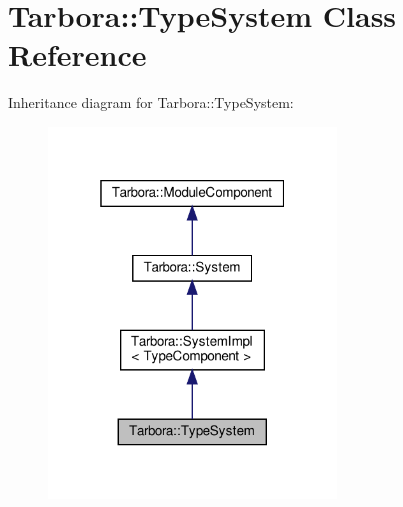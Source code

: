 \hypertarget{classTarbora_1_1TypeSystem}{}\section{Tarbora\+:\+:Type\+System Class Reference}
\label{classTarbora_1_1TypeSystem}


Inheritance diagram for Tarbora\+:\+:Type\+System\+:\nopagebreak
\begin{figure}[H]
\begin{center}
\leavevmode
\includegraphics[width=217pt]{classTarbora_1_1TypeSystem__inherit__graph}
\end{center}
\end{figure}



